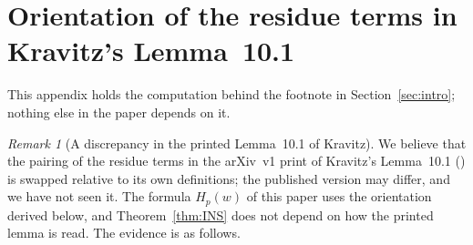 \documentclass[11pt]{article}
\theoremstyle{definition}
\theoremstyle{remark}
\newtheorem{remark}[theorem]{Remark}
\begin{document}
\section{Orientation of the residue terms in Kravitz's Lemma~10.1}\label{sec:appsign}
This appendix holds the computation behind the footnote in Section~\ref{sec:intro}; nothing else in the paper depends on it.
\begin{remark}[A discrepancy in the printed Lemma~10.1 of Kravitz]\label{rem:sign}
We believe that the pairing of the residue terms in the arXiv~v1 print of Kravitz's Lemma~10.1 (\cite[p.~19]{K}) is swapped relative to its own definitions; the published version may differ, and we have not seen it. The formula $H_p(w)$ of this paper uses the orientation derived below, and Theorem~\ref{thm:INS} does not depend on how the printed lemma is read. The evidence is as follows.


\end{remark}
\end{document}
